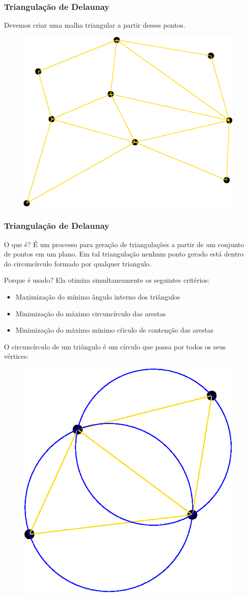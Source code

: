 \documentclass{beamer}
\begin{document}
\begin{frame}
  \frametitle{Triangulação de Delaunay}
  Devemos criar uma malha triangular a partir desses pontos.
  \begin{figure}
    \includegraphics[width=0.5\linewidth]{dela2.eps}
  \end{figure}
\end{frame}

\begin{frame}
  \frametitle{Triangulação de Delaunay}

  \begin{block}{O que é?}
    É um processo para geração de triangulações a partir de um conjunto de pontos em um plano. Em tal triangulação nenhum ponto gerado está dentro do circuncírculo formado por qualquer triangulo.
  \end{block}

  \begin{block}{Porque é usado?}
    Ela otimiza simultaneamente os seguintes critérios:
    \begin{itemize}
      \item Maximização do mínimo ângulo interno dos triângulos
      \item Minimização do máximo circuncírculo das arestas
      \item Minimização do máximo mínimo cŕiculo de contenção das arestas
    \end{itemize}
  \end{block}
\end{frame}


\begin{frame}
  O circuncírculo de um triângulo é um círculo que passa por todos os seus vértices:

  \begin{figure}
    \includegraphics[width=0.3\linewidth]{dela3.eps}
  \end{figure}


\end{frame}
\end{document}
